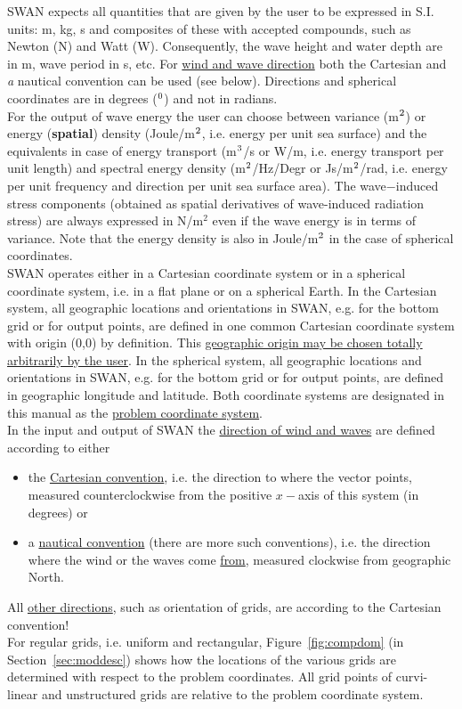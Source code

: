 \documentclass[12pt]{book}
\begin{document}
SWAN expects all quantities that are given by the user to be expressed in S.I. units:
m, kg, s and composites of these with accepted compounds, such as Newton
(N) and Watt (W). Consequently, the wave height and water depth are in m,
wave period in s, etc. For \underline{wind and wave direction} both the
Cartesian and {\em a} nautical convention can be used (see below). Directions and spherical
coordinates are in degrees ($^{{\rm 0}}$) and not in radians.
\\[2ex]
\noindent
For the output of wave energy the user can choose between variance (m$^{{\rm 2}}$) or energy
({\bf spatial}) density (Joule/m$^{{\rm 2}}$, i.e. energy per unit sea surface) and the
equivalents in case of energy transport (m$^{{\rm 3}}$/s or W/m, i.e. energy transport per unit
length) and spectral energy density (m$^{{\rm 2}}$/Hz/Degr or Js/m$^{{\rm 2}}$/rad, i.e. energy
per unit frequency and direction per unit sea surface area). The wave$-$induced stress
components (obtained as spatial derivatives of wave-induced radiation stress) are always expressed
in N/m$^2$ even if the wave energy is in terms of variance. Note that the energy density is also in
Joule/m$^{{\rm 2}}$ in the case of spherical coordinates.
\\[2ex]
\noindent
SWAN operates either in a Cartesian coordinate system or in a spherical coordinate system, i.e.
in a flat plane or on a spherical Earth. In the Cartesian system, all geographic locations and
orientations in SWAN, e.g. for the bottom grid or for output points, are defined in one common
Cartesian coordinate system with origin (0,0) by definition. This \underline{geographic origin
may be chosen totally arbitrarily by the user}. In the spherical system, all geographic locations
and orientations in SWAN, e.g. for the bottom grid or for output points, are defined in geographic
longitude and latitude. Both coordinate systems are designated in this manual as the
\underline{problem coordinate system}.
\\[2ex]
\noindent
In the input and output of SWAN the \underline{direction of wind and waves} are defined according to either
\begin{itemize}
 \item the \underline{Cartesian convention}, i.e. the direction to where the vector points, measured
       counterclockwise from the positive $x-$axis of this system (in degrees) or
 \item a \underline{nautical convention} (there are more such conventions), i.e. the direction where
       the wind or the waves come \underline{from}, measured clockwise from geographic North.
\end{itemize}
All \underline{other directions}, such as orientation of grids, are according to the Cartesian convention!
\\[2ex]
\noindent
For regular grids, i.e. uniform and rectangular, Figure~\ref{fig:compdom} (in Section~\ref{sec:moddesc})
shows how the locations of the various grids are determined with respect to the problem coordinates.
All grid points of curvi-linear and unstructured grids are relative to the problem coordinate system.
\end{document}
